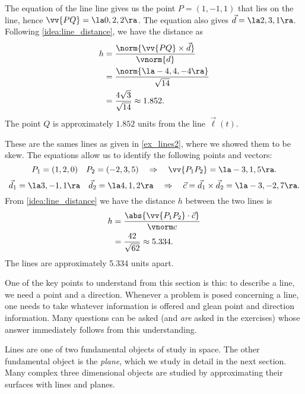 {The equation of the line line gives us the point $P=(1,-1,1)$ that lies on the line, hence $\vv{PQ} = \la 0,2,2\ra$. The equation also gives $\vec d= \la 2,3,1\ra$. Following \autoref{idea:line_distance}, we have the distance as 
\begin{align*}
h &= \frac{\norm{\vv{PQ}\times \vec d}}{\vnorm{d}}\\
	&= \frac{\norm{\la -4,4,-4\ra}}{\sqrt{14}}\\
	&=\frac{4\sqrt{3}}{\sqrt{14}} \approx 1.852.
\end{align*}
The point $Q$ is approximately $1.852$ units from the line $\vec\ell(t)$.}

{These are the sames lines as given in \autoref{ex_lines2}, where we showed them to be skew. The equations allow us to identify the following points and vectors:
$$P_1 = (1,2,0)\quad P_2 = (-2,3,5) \quad \Rightarrow \quad \vv{P_1P_2} = \la -3,1,5\ra.$$
$$\vec d_1 = \la 3,-1,1\ra \quad \vec d_2 = \la 4,1,2\ra \quad \Rightarrow \quad \vec c = \vec d_1\times \vec d_2 = \la -3,-2,7\ra.$$
From \autoref{idea:line_distance} we have the distance $h$ between the two lines is
\begin{align*}
h &= \frac{\abs{\vv{P_1P_2}\cdot \vec c}}{\vnorm c}\\
&=\frac{42}{\sqrt{62}} \approx 5.334.
\end{align*}
The lines are approximately 5.334 units apart.}

One of the key points to understand from this section is this: to describe a line, we need a point and a direction. Whenever a problem is posed concerning a line, one  needs to take whatever information is offered and glean point and direction information. Many questions can be asked (and \emph{are} asked in the exercises) whose answer immediately follows from this understanding. 

Lines are one of two fundamental objects of study in space. The other fundamental object is the \emph{plane}, which we study in detail in the next section. Many complex three dimensional objects are studied by approximating their surfaces with lines and planes.

